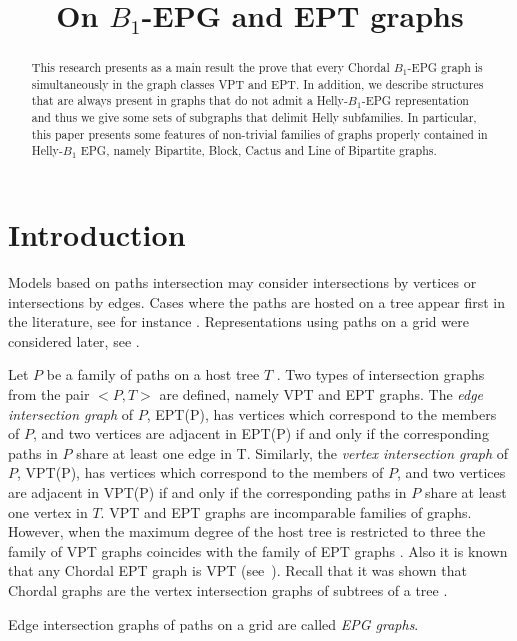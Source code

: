 \documentclass{dmgt}
\title{On $B_1$-EPG  and EPT graphs}
\begin{document}
\begin{abstract}
This research presents as a main result the prove that every Chordal $B_1$-EPG graph is simultaneously in the graph classes VPT and EPT. In addition, we  describe structures that are always present in graphs that do not admit a Helly-$B_1$-EPG representation and thus we give some sets of subgraphs that delimit Helly subfamilies.   
In particular, this paper presents  some features of non-trivial families of graphs properly contained in Helly-$B_1$ EPG, namely Bipartite, Block, Cactus and Line of Bipartite  graphs. 
\end{abstract}

\section{Introduction}

Models based on paths intersection  may consider  intersections by vertices or   intersections by edges.  Cases where the paths are hosted on a tree  appear first in the literature, see for instance \cite{gavril1978recognition, golumbic1985edge, golumbic1985}.  Representations using paths on a grid were considered later, see  \cite{golumbic2009,golumbic2013, golumbic2013intersection}. %

 Let $P$ be a family of paths on a host tree $T$ . Two types of intersection graphs from the pair $<P,T>$ are defined, namely VPT and EPT graphs.
The \textit{edge intersection graph} of $P$, EPT(P), has vertices which correspond to the members of $P$, and two vertices are adjacent in EPT(P) if and only if the corresponding paths in $P$ share at least one edge in T. Similarly, the \textit{vertex intersection graph} of $P$, VPT(P), has vertices which correspond to the members of $P$, and two vertices are adjacent in VPT(P) if and only if the corresponding paths in $P$ share at least one vertex in $T$.
%
VPT and EPT graphs are incomparable families of graphs. However, when the maximum degree of the host tree is restricted to three the family of
VPT graphs coincides with the family of EPT graphs \cite{golumbic1985edge%
}. Also it is known that any Chordal EPT graph is VPT (see~\cite{syslo1985triangulated}). Recall that it was shown that Chordal graphs are the vertex intersection graphs of subtrees of a tree \cite{gavril1974intersection}.

Edge intersection graphs of paths on a grid are called \textit{EPG graphs}. 
\end{document}
